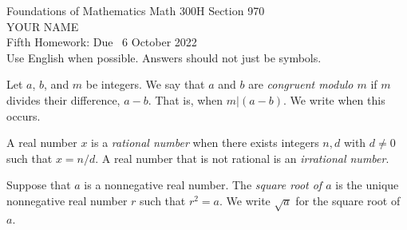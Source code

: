 \documentclass[12pt]{article}
\newcommand{\defcolor}[1]{{\color{blue}{#1}}}
\newcommand{\demph}[1]{{\color{blue}\sl{#1}}}
\begin{document}
\LARGE 
\noindent
{\color{Maroon}Foundations of Mathematics \hfill Math 300H Section 970}\vspace{2pt}\\
\Large YOUR NAME\vspace{2pt}\\
\large
Fifth Homework: \hfill Due \  6 October 2022\\
Use English when possible.  Answers should not just be symbols.
\normalsize\medskip



\noindent{\color{blue}\rule{500pt}{2pt}}\medskip



  Let $a$, $b$, and $m$ be integers.
We say that $a$ and $b$ are \demph{congruent modulo $m$} if $m$ divides their difference, $a-b$.
That is, when $m|(a-b)$.
We write \defcolor{$a\equiv b\mod m$} when this occurs.

A real number $x$ is a \demph{rational number} when there exists integers $n,d$ with $d\neq 0$ such that  $x=n/d$.
  A real number that is not rational is an \demph{irrational number}.


Suppose that $a$ is a nonnegative real number.
The \demph{square root of $a$} is the unique nonnegative real number $r$ such that $r^2=a$.
We write \demph{$\sqrt{a}$} for the square root of $a$.



\noindent{\color{blue}\rule{500pt}{2pt}}\smallskip
\end{document}
